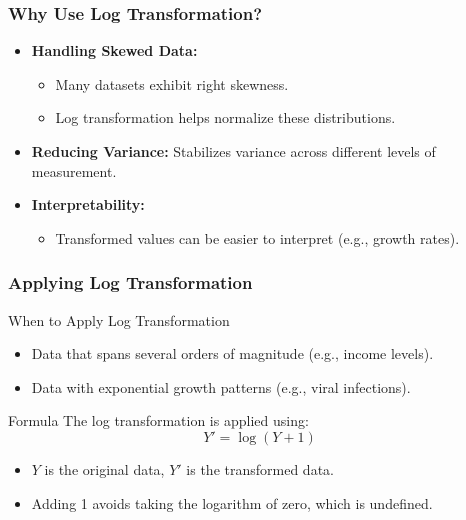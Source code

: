 \documentclass[aspectratio=169]{beamer}
\begin{document}
\begin{frame}[fragile]
  \frametitle{Why Use Log Transformation?}
  \begin{itemize}
    \item \textbf{Handling Skewed Data:} 
      \begin{itemize}
        \item Many datasets exhibit right skewness. 
        \item Log transformation helps normalize these distributions.
      \end{itemize}
    \item \textbf{Reducing Variance:} Stabilizes variance across different levels of measurement.
    \item \textbf{Interpretability:} 
      \begin{itemize}
        \item Transformed values can be easier to interpret (e.g., growth rates).
      \end{itemize}
  \end{itemize}
\end{frame}

\begin{frame}[fragile]
  \frametitle{Applying Log Transformation}
  \begin{block}{When to Apply Log Transformation}
    \begin{itemize}
      \item Data that spans several orders of magnitude (e.g., income levels).
      \item Data with exponential growth patterns (e.g., viral infections).
    \end{itemize}
  \end{block}

  \begin{block}{Formula}
    The log transformation is applied using:
    \begin{equation}
      Y' = \log(Y + 1)
    \end{equation}
    \begin{itemize}
      \item \(Y\) is the original data, \(Y'\) is the transformed data.
      \item Adding 1 avoids taking the logarithm of zero, which is undefined.
    \end{itemize}
  \end{block}
\end{frame}
\end{document}
